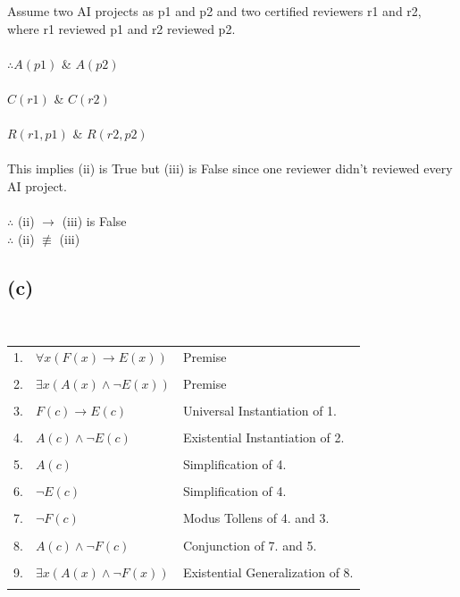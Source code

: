 \documentclass[a4paper,12pt]{article}
\begin{document}
Assume two AI projects as p1 and p2 and two certified reviewers r1 and r2, where r1 reviewed p1 and r2 reviewed p2.\\\\
\hspace*{0.7cm}$\therefore A(p1)$ \& $A(p2)$\\\\
\hspace*{1cm}$C(r1)$ \& $C(r2)$\\\\
\hspace*{1cm}$R(r1, p1)$ \& $R(r2, p2)$\\\\

This implies (ii) is True but (iii) is False since one reviewer didn't reviewed every AI project.\\\\
$\therefore$ (ii) $\rightarrow$ (iii) is False\\
$\therefore$ (ii) $\not \equiv$ (iii)

\subsection{(c)}
\,\\
\begin{tabular}{rll}
    1. & $\forall x (F(x) \rightarrow E(x))$ & Premise\\\\
    2. & $\exists x (A(x) \land \neg E(x))$ & Premise\\\\
    3. & $F(c) \rightarrow E(c)$ & Universal Instantiation of 1.\\\\
    4. & $A(c) \land \neg E(c)$ & Existential Instantiation of 2.\\\\
    5. & $A(c)$ & Simplification of 4.\\\\
    6. & $\neg E(c)$ & Simplification of 4.\\\\
    7. & $\neg F(c)$ & Modus Tollens of 4. and 3.\\\\
    8. & $A(c) \land \neg F(c)$ & Conjunction of 7. and 5.\\\\
    9. & $\exists x (A(x) \land \neg F(x))$ & Existential Generalization of 8.\\\\
\end{tabular}
\end{document}
